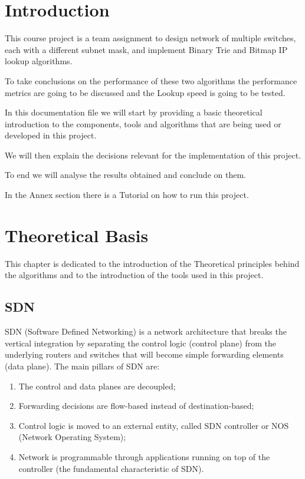 \documentclass[]{report}
\begin{document}


\tableofcontents
\listoffigures
\listoftables

\chapter{Introduction}
This course project is a team assignment to design network of multiple switches, each with a different subnet mask, and implement Binary Trie and Bitmap IP lookup algorithms.

To take conclusions on the performance of these two algorithms the performance metrics are going to be discussed and the Lookup speed is going to be tested.

In this documentation file we will start by providing a basic theoretical introduction to the components, tools and algorithms that are being used or developed in this project. 

We will then explain the decisions relevant for the implementation of this project.

To end we will analyse the results obtained and conclude on them.

In the Annex section there is a Tutorial on how to run this project.

\chapter{Theoretical Basis}
This chapter is dedicated to the introduction of the Theoretical principles behind the algorithms and to the introduction of the tools used in this project. 
\section{SDN}
SDN (Software Defined Networking) is a network architecture that breaks the vertical integration by separating the control logic (control plane) from the underlying routers and switches that will become simple forwarding elements (data plane). 
The main pillars of SDN are:
\begin{enumerate}
\item The control and data planes are decoupled;
\item Forwarding decisions are flow-based instead of destination-based;
\item Control logic is moved to an external entity, called SDN controller or NOS (Network Operating System);
\item Network is programmable through applications running on top of the controller (the fundamental characteristic of SDN).
\end{enumerate}
\end{document}

